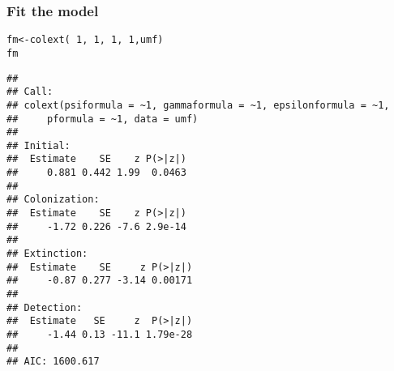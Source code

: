 \documentclass[color=usenames,dvipsnames]{beamer}\usepackage[]{graphicx}\usepackage[]{color}
\makeatletter
\newcommand{\hlnum}[1]{\textcolor[rgb]{0.69,0.494,0}{#1}}%
\newcommand{\hlopt}[1]{\textcolor[rgb]{0,0,0}{#1}}%
\newcommand{\hlstd}[1]{\textcolor[rgb]{0,0,0}{#1}}%
\newcommand{\hlkwb}[1]{\textcolor[rgb]{0,0.341,0.682}{#1}}%
\newcommand{\hlkwd}[1]{\textcolor[rgb]{0.004,0.004,0.506}{#1}}%
\newenvironment{kframe}{%
 \def\at@end@of@kframe{}%
 \ifinner\ifhmode%
  \def\at@end@of@kframe{\end{minipage}}%
  \begin{minipage}{\columnwidth}%
 \fi\fi%
 \def\FrameCommand##1{\hskip\@totalleftmargin \hskip-\fboxsep
 \colorbox{shadecolor}{##1}\hskip-\fboxsep
     \hskip-\linewidth \hskip-\@totalleftmargin \hskip\columnwidth}%
 \MakeFramed {\advance\hsize-\width
   \@totalleftmargin\z@ \linewidth\hsize
   \@setminipage}}%
 {\par\unskip\endMakeFramed%
 \at@end@of@kframe}
\newenvironment{knitrout}{}{} %
\makeatother
\begin{document}
\begin{frame}[fragile]
  \frametitle{Fit the model}
  \footnotesize
\begin{knitrout}\tiny
{}\color{fgcolor}\begin{kframe}
\begin{alltt}
\hlstd{fm} \hlkwb{<-} \hlkwd{colext}\hlstd{(}\hlopt{~}\hlnum{1}\hlstd{,}\hlopt{~}\hlnum{1}\hlstd{,}\hlopt{~}\hlnum{1}\hlstd{,}\hlopt{~}\hlnum{1}\hlstd{, umf)}
\hlstd{fm}
\end{alltt}
\begin{verbatim}
## 
## Call:
## colext(psiformula = ~1, gammaformula = ~1, epsilonformula = ~1, 
##     pformula = ~1, data = umf)
## 
## Initial:
##  Estimate    SE    z P(>|z|)
##     0.881 0.442 1.99  0.0463
## 
## Colonization:
##  Estimate    SE    z P(>|z|)
##     -1.72 0.226 -7.6 2.9e-14
## 
## Extinction:
##  Estimate    SE     z P(>|z|)
##     -0.87 0.277 -3.14 0.00171
## 
## Detection:
##  Estimate   SE     z  P(>|z|)
##     -1.44 0.13 -11.1 1.79e-28
## 
## AIC: 1600.617
\end{verbatim}
\end{kframe}
\end{knitrout}
\end{frame}
\end{document}
